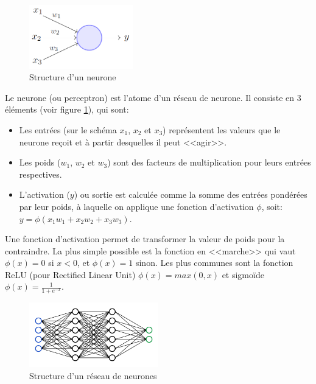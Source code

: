 \documentclass[openany, 11pt]{memoir}
\begin{document}
\begin{figure}[ht]
	\centering
	\includegraphics[width=0.4\textwidth]{images/neurone.png}
	\caption{Structure d'un neurone}
	\label{neurone}
\end{figure}

\bigskip
Le neurone (ou perceptron) est l'atome d'un réseau de neurone. Il consiste en 3 éléments (voir figure \ref{neurone}), qui sont:

\begin{itemize}
	\item Les entrées (sur le schéma $x_1$, $x_2$ et $x_3$) représentent les valeurs que le neurone reçoit et à partir desquelles il peut <<agir>>.
	\item Les poids ($w_1$, $w_2$ et $w_3$) sont des facteurs de multiplication pour leurs entrées respectives.
	\item L'activation ($y$) ou sortie est calculée comme la somme des entrées pondérées par leur poids, à laquelle on applique une fonction d'activation $\phi$, soit: $y = \phi(x_1 w_1 + x_2 w_2 + x_3 w_3)$.
\end{itemize}

Une fonction d'activation permet de transformer la valeur de poids pour la contraindre. La plus simple possible est la fonction en <<marche>> qui vaut $\phi(x) = 0$ si $x < 0$, et $\phi(x) = 1$ sinon. Les plus communes sont la fonction ReLU (pour Rectified Linear Unit) $\phi(x) = max(0, x)$ et sigmoïde $\phi(x) = \frac{1}{1 + e^{-x}}$.

\begin{figure}[ht]
	\centering
	\includegraphics[width=0.5\textwidth]{images/reseau.png}
	\caption{Structure d'un réseau de neurones}
	\label{reseau}
\end{figure}
\end{document}

